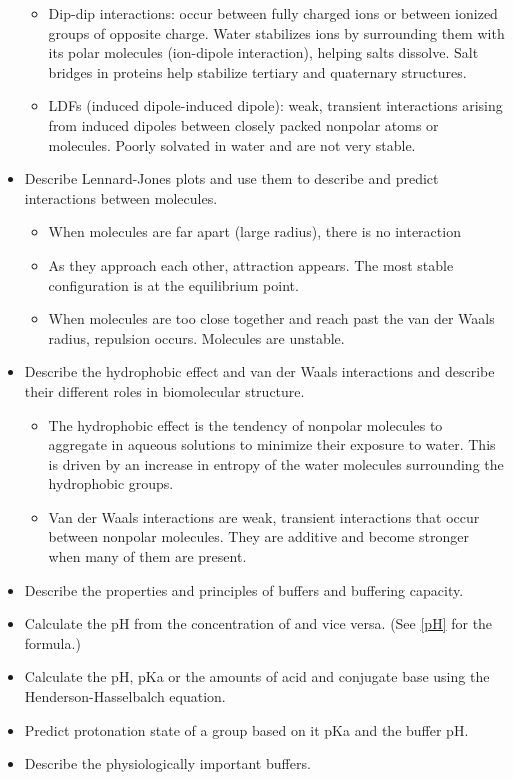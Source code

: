 \documentclass[letterpaper, 12pt]{article}
\begin{document}
\begin{itemize}
\begin{itemize}
\item Dip-dip interactions: occur between fully charged ions or between ionized groups of opposite charge. Water stabilizes ions by surrounding them with its polar molecules (ion-dipole interaction), helping salts dissolve. Salt bridges in proteins help stabilize tertiary and quaternary structures.
\item LDFs (induced dipole-induced dipole): weak, transient interactions arising from induced dipoles between closely packed nonpolar atoms or molecules. Poorly solvated in water and are not very stable.
\end{itemize}
\item Describe Lennard-Jones plots and use them to describe and predict interactions between molecules.
\begin{itemize}
\item When molecules are far apart (large radius), there is no interaction
\item As they approach each other, attraction appears. The most stable configuration is at the equilibrium point.
\item When molecules are too close together and reach past the van der Waals radius, repulsion occurs. Molecules are unstable.
\end{itemize}
\item Describe the hydrophobic effect and van der Waals interactions and describe their different roles in biomolecular structure.
\begin{itemize}
\item The hydrophobic effect is the tendency of nonpolar molecules to aggregate in aqueous solutions to minimize their exposure to water. This is driven by an increase in entropy of the water molecules surrounding the hydrophobic groups.
\item Van der Waals interactions are weak, transient interactions that occur between nonpolar molecules. They are additive and become stronger when many of them are present.
\end{itemize}
\item Describe the properties and principles of buffers and buffering capacity.
\item Calculate the pH from the concentration of  and vice versa. (See \ref{pH} for the formula.)
\item Calculate the pH, pKa or the amounts of acid and conjugate base using the Henderson-Hasselbalch equation.
\item Predict protonation state of a group based on it pKa and the buffer pH.
\item Describe the physiologically important buffers.
\end{itemize}
\end{document}
